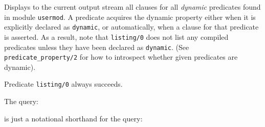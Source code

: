 \begin{description}
%
Displays to the current output stream all clauses for all {\em
  dynamic} predicates found in module {\tt usermod}.  A predicate
acquires the dynamic property either when it is explicitly declared as
{\tt dynamic}, or automatically, when a clause for that predicate is
asserted.  As a result, note that {\tt listing/0} does not list any
compiled predicates unless they have been declared as {\tt dynamic}.
(See {\tt predicate\_property/2} for how to introspect whether given
predicates are dynamic).
%

Predicate {\tt listing/0} always succeeds.

The query:


    \noindent
    is just a notational shorthand for the query:



\end{description}
